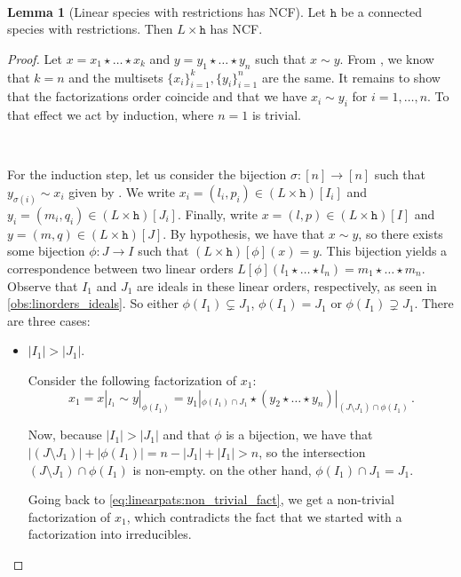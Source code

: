 \documentclass[12pt, reqno]{amsart}
\theoremstyle{definition}
\newtheorem{lm}[thm]{Lemma}
\begin{document}
\

\begin{lm}[Linear species with restrictions has NCF]
Let $\mathtt{h}$ be a connected species with restrictions.
Then $L \times \mathtt{h}$ has NCF.
\end{lm}

\begin{proof}
Let $x = x_1 \star \dots \star x_k $ and $ y =  y_1 \star \dots \star y_n$ such that $x \sim y$.
From \cite[Corollary 3.4.]{Penaguiao2020}, we know that $k = n$ and the multisets $\{x_i\}_{i=1}^k,  \{y_i\}_{i=1}^n$ are the same.
It remains to show that the factorizations order coincide and that we have $x_i \sim y_i$ for $i = 1, \dots , n$.
To that effect we act by induction, where $n = 1$ is trivial.

\

For the induction step, let us consider the bijection $\sigma:[n] \to [n]$ such that $y_{\sigma(i)} \sim x_i$ given by \cite[Corollary 3.4.]{Penaguiao2020}.
We write $x_i = (l_i, p_i)\in (L\times \mathtt{h})[I_i]$ and $y_i = (m_i, q_i)\in (L\times \mathtt{h})[J_i]$.
Finally, write $x = (l, p) \in (L\times \mathtt{h})[I] $ and $y = (m, q) \in (L\times \mathtt{h})[J]$.
By hypothesis, we have that $x \sim y$, so there exists some bijection $\phi: J \to I$ such that $ (L\times \mathtt{h})[\phi](x) = y$.
This bijection yields a correspondence between two linear orders $L [\phi] (l_1 \star \dots \star l_n) = m_1\star \dots \star m_n $.
Observe that $I_1$ and $J_1$ are ideals in these linear orders, respectively, as seen in \cref{obs:linorders_ideals}.
So either  $\phi (I_1)\subsetneq J_1 $, $\phi (I_1)= J_1 $ or $\phi (I_1)\supsetneq J_1 $.
There are three cases:
\begin{itemize}
    \item $|I_1| > |J_1|$.
    
Consider the following factorization of $x_1 $:
\begin{equation}\label{eq:linearpats:non_trivial_fact}
x_1 = x|_{I_1} \sim y|_{\phi(I_1)} = y_1|_{\phi(I_1) \cap J_1} \star (y_2 \star \dots \star y_n)|_{(J\setminus J_1) \cap \phi(I_1)}\, . 
\end{equation}


Now, because $|I_1| > |J_1|$ and that $\phi $ is a bijection, we have that $| (J\setminus J_1) | + | \phi(I_1) | = n - |J_1| + |I_1| > n$, so the intersection $(J\setminus J_1) \cap \phi(I_1)$ is non-empty.
on the other hand, $\phi(I_1) \cap J_1 = J_1$.

Going back to \eqref{eq:linearpats:non_trivial_fact}, we get a non-trivial factorization of $x_1$, which contradicts the fact that we started with a factorization into irreducibles.


\end{itemize}
\end{proof}
\end{document}
